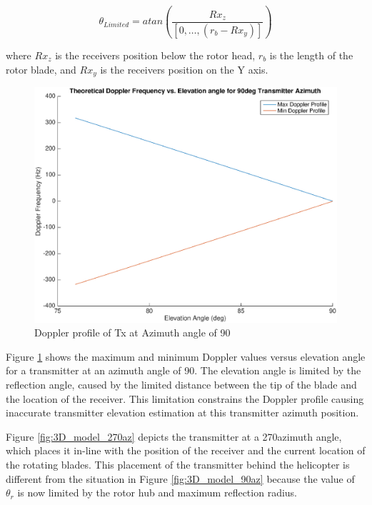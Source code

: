\begin{equation}
	\theta_{Limited} = atan\left(\frac{Rx_z}{[0,\dots, (r_b - Rx_y)]}\right)
	\label{eq:theory_90_limited}
\end{equation}

where $Rx_z$ is the receivers position below the rotor head, $r_b$ is the length of the rotor blade, and $Rx_y$ is the receivers position on the Y axis.

\begin{figure}
	\begin{center}
		\includegraphics[width=15cm]{images/background/3d_geometry_tx_90az_doppler_profile.eps}
		\caption{Doppler profile of Tx at Azimuth angle of 90\textdegree}
		\label{fig:3D_model_90az_doppler}
	\end{center}
\end{figure}

Figure \ref{fig:3D_model_90az_doppler} shows the maximum and minimum Doppler values versus elevation angle for a transmitter at an azimuth angle of 90\textdegree. The elevation angle is limited by the reflection angle, caused by the limited distance between the tip of the blade and the location of the receiver. This limitation constrains the Doppler profile causing inaccurate transmitter elevation estimation at this transmitter azimuth position.

Figure \ref{fig:3D_model_270az} depicts the transmitter at a 270\textdegree \space azimuth angle, which places it in-line with the position of the receiver and the current location of the rotating blades. This placement of the transmitter behind the helicopter is different from the situation in Figure \ref{fig:3D_model_90az} because the value of $\theta_r$ is now limited by the  rotor hub and maximum reflection radius.

